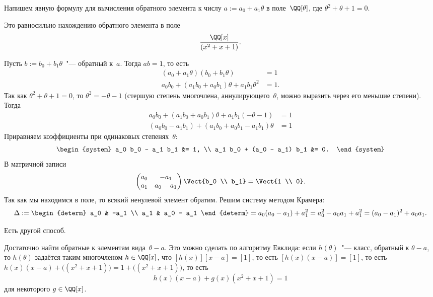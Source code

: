 \begin{example}
	Напишем явную формулу для вычисления обратного элемента к числу $a := a_0 + a_1 \theta$ в поле~$\QQ[\theta]$, где $\theta^2 + \theta + 1 = 0$.

	Это равносильно нахождению обратного элемента в поле
	\[
		\frac{\QQ[x]}{(x^2 + x + 1)}
		.
	\]

	Пусть $b := b_0 + b_1\theta$~"--- обратный к~$a$. Тогда $ab = 1$, то есть
	\begin{align*}
		(a_0 + a_1 \theta) (b_0 + b_1 \theta) &= 1
		\\
		a_0 b_0 + (a_1 b_0 + a_0 b_1) \theta + a_1 b_1 \theta^2 &= 1
		.
	\end{align*}
	Так как $\theta^2 + \theta + 1 = 0$, то $\theta^2 = -\theta - 1$ (стершую степень многочлена, аннулирующего~$\theta$, можно выразить через его меньшие степени). Тогда
	\begin{align*}
		a_0 b_0 + (a_1 b_0 + a_0 b_1) \theta + a_1 b_1 (-\theta - 1) &= 1
		\\
		(a_0 b_0 - a_1 b_1) +
		(a_1 b_0 + a_0 b_1 - a_1 b_1) \theta &= 1
	\end{align*}
	Приравняем коэффициенты при одинаковых степенях~$\theta$:
	\[
		\begin{system}
			a_0 b_0 - a_1 b_1 &= 1,
			\\
			a_1 b_0 + (a_0 - a_1) b_1 &= 0.
		\end{system}
	\]
	В матричной записи
	\[
		\begin{pmatrix}
			a_0 & -a_1
			\\
			a_1 & a_0 - a_1
		\end{pmatrix}
		\Vect{b_0 \\ b_1}
		=
		\Vect{1 \\ 0}.
	\]
	Так как мы находимся в поле, то всякий ненулевой элемент обратим. Решим систему методом Крамера:
	\[
		\Delta :=
		\begin{determ}
			a_0 & -a_1
			\\
			a_1 & a_0 - a_1
		\end{determ}
		=
		a_0 (a_0 - a_1) + a_1^2 =
		a_0^2 - a_0 a_1 + a_1^2 =
		(a_0 - a_1)^2 + a_0 a_1.
	\]

	\textstars

	Есть другой способ.

	Достаточно найти обратные к элементам вида~$\theta - a$. Это можно сделать по алгоритму Евклида: если $h(\theta)$~"--- класс, обратный к $\theta - a$, то $h(\theta)$ задаётся таким многочленом $h \in \QQ[x]$, что $[h(x)][x-a] = [1]$, то есть $[h(x)(x-a)] = [1]$, то есть $h(x)(x-a) + \bigl( (x^2 + x + 1) \bigr) = 1 + \bigl( (x^2 + x + 1) \bigr)$, то есть
	\[
		h(x) (x - a) + g(x)(x^2 + x + 1) = 1
	\]
	для некоторого $g \in \QQ[x]$.


\end{example}
